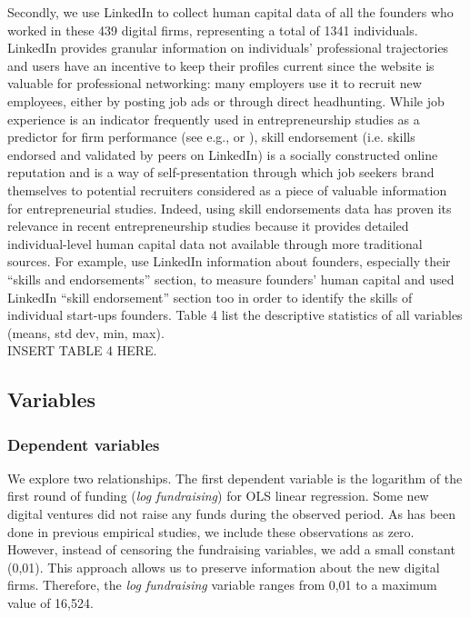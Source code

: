 \documentclass[12pt]{article}
\begin{document}
Secondly, we use LinkedIn to collect human capital data of all the founders who worked in these 439 digital firms, representing a total of 1341 individuals. LinkedIn provides granular information on individuals’ professional trajectories and users have an incentive to keep their profiles current since the website is valuable for professional networking: many employers use it to recruit new employees, either by posting job ads or through direct headhunting. While job experience is an indicator frequently used in entrepreneurship studies as a predictor for firm performance (see e.g., \citet{colombo2005founders} or \citet{delmar2006does}), skill endorsement (i.e. skills endorsed and validated by peers on LinkedIn) is a socially constructed online reputation and is a way of self-presentation through which job seekers brand themselves to potential recruiters \citep{rapanta2017linkedin} considered as a piece of valuable information for entrepreneurial studies. Indeed, using skill endorsements data has proven its relevance in recent entrepreneurship studies because it provides detailed individual-level human capital data not available through more traditional sources. For example, \citet{reese2020should} use LinkedIn information about founders, especially their “skills and endorsements” section, to measure founders’ human capital and \citet{sako2020scaling} used LinkedIn “skill endorsement” section too in order to identify the skills of individual start-ups founders. Table 4\label{table4} list the descriptive statistics of all variables (means, std dev, min, max). \\

INSERT TABLE 4 HERE.

\subsection{Variables}

\subsubsection{Dependent variables}

We explore two relationships. The first dependent variable is the logarithm of the first round of funding (\textit{log fundraising}) for OLS linear regression. Some new digital ventures did not raise any funds during the observed period. As has been done in previous empirical studies, we include these observations as zero. However, instead of censoring the fundraising variables, we add a small constant (0,01). This approach allows us to preserve information about the new digital firms. Therefore, the \textit{log fundraising} variable ranges from 0,01 to a maximum value of 16,524. \\
\end{document}
